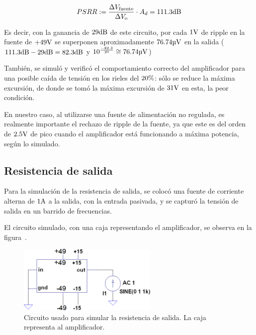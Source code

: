 \[ PSRR := {\Delta V_\mathrm{fuente} \over {\Delta V_\mathrm{o}}} \cdot A_d = 111.3 \si[per-mode=symbol]{\decibel} \]



Es decir, con la ganancia de $29 \si[per-mode=symbol]{\decibel}$ de este circuito, por cada $1 \si[per-mode=symbol]{\volt}$ de ripple en la fuente de $+49 \si[per-mode=symbol]{\volt}$ se superponen aproximadamente $76.74 \si[per-mode=symbol]{\micro\volt}$ en la salida ($111.3 \si[per-mode=symbol]{\decibel} - 29 \si[per-mode=symbol]{\decibel} = 82.3 \si[per-mode=symbol]{\decibel}$ y $10^\frac{-82.3}{20} \cong 76.74 \si[per-mode=symbol]{\micro\volt} $)

También, se simuló y verificó el comportamiento correcto del amplificador para una posible caída de tensión en los rieles del $20 \si[per-mode=symbol]{\percent}$: sólo se reduce la máxima excursión, de donde se tomó la máxima excursión de $31 \si[per-mode=symbol]{\volt}$ en esta, la peor condición.

En nuestro caso, al utilizarse una fuente de alimentación no regulada, es realmente importante el rechazo de ripple de la fuente, ya que este es del orden de $2.5 \si[per-mode=symbol]{\volt}$ de pico cuando el amplificador está funcionando a máxima potencia, según lo simulado.

\subsection{Resistencia de salida}  

Para la simulación de la resistencia de salida, se colocó una fuente de corriente alterna de $1 \si[per-mode=symbol]{\ampere}$ a la salida, con la entrada pasivada, y se capturó la tensión de salida en un barrido de frecuencias.


El circuito simulado, con una caja representando el amplificador, se observa en la figura~.


\begin{figure}[H]
	\centering
	\includegraphics[width=0.6\textwidth]{img/sims/circuito-r_out-current.png}
	\caption{Circuito usado para simular la resistencia de salida. La caja representa al amplificador.}
	\label{fig:circuito_r-out-current}
\end{figure}

